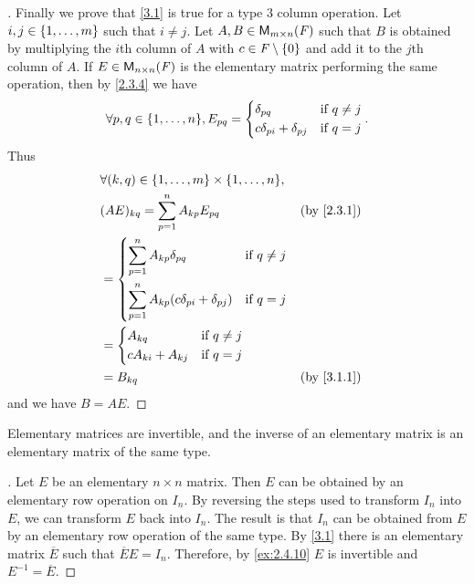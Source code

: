 \begin{proof}[]
	Finally we prove that \cref{3.1} is true for a type 3 column operation.
	Let \(i, j \in \left\lbrace1, \dots, m\right\rbrace\) such that \(i \neq j\).
	Let \(A, B \in \MS\) such that \(B\) is obtained by multiplying the \(i\)th column of \(A\) with \(c \in \mathit{F} \setminus \left\lbrace0\right\rbrace\) and add it to the \(j\)th column of \(A\).
	If \(E \in \ms[n][n][\F]\) is the elementary matrix performing the same operation, then by \cref{2.3.4} we have
	\[
		\forall p, q \in \set{1, \dots, n}, E_{p q} = \begin{dcases}
			\delta_{p q}                  & \text{if } q \neq j \\
			c \delta_{p i} + \delta_{p j} & \text{if } q = j
		\end{dcases}.
	\]
	Thus
	\begin{align*}
		 & \forall (k, q) \in \set{1, \dots, m} \times \set{1, \dots, n},                                  \\
		 & (AE)_{k q} = \sum_{p = 1}^n A_{k p} E_{p q}                                     &  & \by{2.3.1} \\
		 & = \begin{dcases}
			     \sum_{p = 1}^n A_{k p} \delta_{p q}                    & \text{if } q \neq j \\
			     \sum_{p = 1}^n A_{k p} (c \delta_{p i} + \delta_{p j}) & \text{if } q = j
		     \end{dcases}                  \\
		 & = \begin{dcases}
			     A_{k q}             & \text{if } q \neq j \\
			     c A_{k i} + A_{k j} & \text{if } q = j
		     \end{dcases}                                                     \\
		 & = B_{k q}                                                                       &  & \by{3.1.1}
	\end{align*}
	and we have \(B = AE\).
\end{proof}

\begin{thm}\label{3.2}
	Elementary matrices are invertible, and the inverse of an elementary matrix is an elementary matrix of the same type.
\end{thm}

\begin{proof}[]
	Let \(E\) be an elementary \(n \times n\) matrix.
	Then \(E\) can be obtained by an elementary row operation on \(I_n\).
	By reversing the steps used to transform \(I_n\) into \(E\), we can transform \(E\) back into \(I_n\).
	The result is that \(I_n\) can be obtained from \(E\) by an elementary row operation of the same type.
	By \cref{3.1} there is an elementary matrix \(\overline{E}\) such that \(\overline{E} E = I_n\).
	Therefore, by \cref{ex:2.4.10} \(E\) is invertible and \(E^{-1} = \overline{E}\).
\end{proof}

